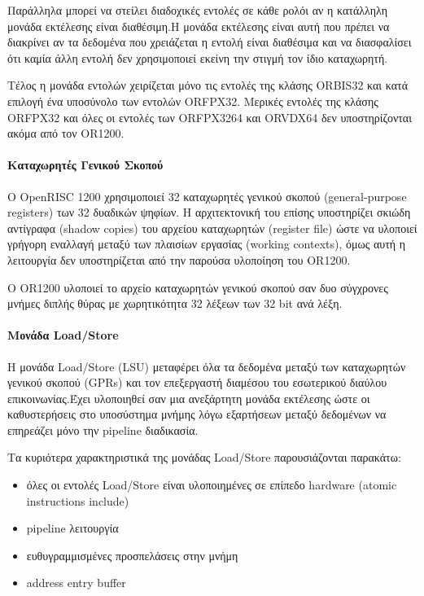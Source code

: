 \documentclass[a4paper,10pt]{article}
\numberwithin{figure}{subsection}
\numberwithin{table}{subsection}
\begin{document}
{Παράλληλα μπορεί να στείλει διαδοχικές εντολές σε κάθε ρολόι αν η κατάλληλη μονάδα εκτέλεσης
είναι διαθέσιμη.Η μονάδα εκτέλεσης είναι αυτή που πρέπει να διακρίνει αν τα δεδομένα που χρειάζεται
η εντολή είναι διαθέσιμα και να διασφαλίσει ότι καμία άλλη εντολή δεν χρησιμοποιεί εκείνη την
στιγμή τον ίδιο καταχωρητή.
\newline

Τέλος η μονάδα εντολών χειρίζεται μόνο τις εντολές της κλάσης ORBIS32 και κατά επιλογή ένα
υποσύνολο των εντολών ORFPX32. Μερικές εντολές της κλάσης ORFPX32  και όλες οι εντολές
των ORFPX3264 και ORVDX64 δεν υποστηρίζονται ακόμα από τον OR1200. 

\paragraph{Καταχωρητές Γενικού Σκοπού\newline\newline}

Ο OpenRISC 1200 χρησιμοποιεί 32 καταχωρητές γενικού σκοπού (general-purpose registers) των 32 δυαδικών ψηφίων.
Η αρχιτεκτονική του επίσης υποστηρίζει σκιώδη αντίγραφα (shadow copies) του αρχείου καταχωρητών (register file)
ώστε να υλοποιεί γρήγορη εναλλαγή μεταξύ των πλαισίων εργασίας (working contexts), όμως
αυτή η λειτουργία δεν υποστηρίζεται από την παρούσα υλοποίηση του OR1200.
\newline

Ο OR1200 υλοποιεί το αρχείο καταχωρητών γενικού σκοπού σαν δυο σύγχρονες μνήμες διπλής θύρας
με χωρητικότητα 32 λέξεων των 32 bit  ανά λέξη.

\paragraph{Μονάδα Load/Store\newline\newline}

Η μονάδα Load/Store (LSU) μεταφέρει όλα τα δεδομένα μεταξύ των καταχωρητών γενικού σκοπού (GPRs) και τον
επεξεργαστή διαμέσου του εσωτερικού διαύλου επικοινωνίας.Έχει υλοποιηθεί σαν μια ανεξάρτητη μονάδα
εκτέλεσης ώστε οι καθυστερήσεις στο υποσύστημα μνήμης λόγω εξαρτήσεων μεταξύ δεδομένων να
επηρεάζει μόνο την pipeline διαδικασία.
\newline

Τα κυριότερα χαρακτηριστικά της μονάδας Load/Store παρουσιάζονται παρακάτω:


\begin{itemize}
 \item όλες οι εντολές Load/Store είναι υλοποιημένες σε επίπεδο hardware (atomic instructions include)
 \item pipeline λειτουργία
 \item ευθυγραμμισμένες προσπελάσεις στην μνήμη
 \item address entry buffer
\end{itemize}

}
\end{document}
